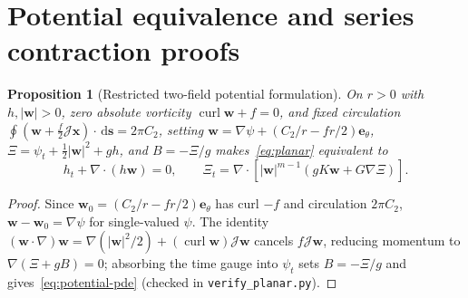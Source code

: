 \documentclass[12pt,a4paper,oneside]{report}
\numberwithin{equation}{chapter}
\newtheorem{proposition}[theorem]{Proposition}
\theoremstyle{definition}
\theoremstyle{remark}\newtheorem{remark}[theorem]{Remark}
\newcommand{\dd}{\,\mathrm d}
\DeclareRobustCommand{\code}[1]{\nolinkurl{#1}}
\begin{document}
\section{Potential equivalence and series contraction proofs}\label{app:potential-proof}\label{app:saddle-proof}

\begin{proposition}[Restricted two-field potential formulation]\label{prop:potential-app}
On $r>0$ with $h,|\mathbf w|>0$, zero absolute vorticity $\operatorname{curl}\mathbf w+f=0$, and fixed circulation $\oint(\mathbf w+\frac{f}{2}\mathcal J\mathbf x)\cdot\dd\mathbf s=2\pi C_2$, setting $\mathbf w=\nabla\psi+(C_2/r-fr/2)\mathbf e_\theta$, $\Xi=\psi_t+\tfrac12|\mathbf w|^2+gh$, and $B=-\Xi/g$ makes~\eqref{eq:planar} equivalent to
\begin{equation}\label{eq:potential-pde}
 h_t+\nabla\cdot(h\mathbf w)=0,\qquad
 \Xi_t=\nabla\cdot\!\left[|\mathbf w|^{m-1}(gK\mathbf w+G\nabla\Xi)\right].
\end{equation}
\end{proposition}
\begin{proof}
Since $\mathbf w_0=(C_2/r-fr/2)\mathbf e_\theta$ has curl $-f$ and circulation $2\pi C_2$, $\mathbf w-\mathbf w_0=\nabla\psi$ for single-valued $\psi$. The identity $(\mathbf w\cdot\nabla)\mathbf w=\nabla(|\mathbf w|^2/2)+(\operatorname{curl}\mathbf w)\mathcal J\mathbf w$ cancels $f\mathcal J\mathbf w$, reducing momentum to $\nabla(\Xi+gB)=0$; absorbing the time gauge into $\psi_t$ sets $B=-\Xi/g$ and gives~\eqref{eq:potential-pde} (checked in \code{verify_planar.py}).
\end{proof}
\end{document}
